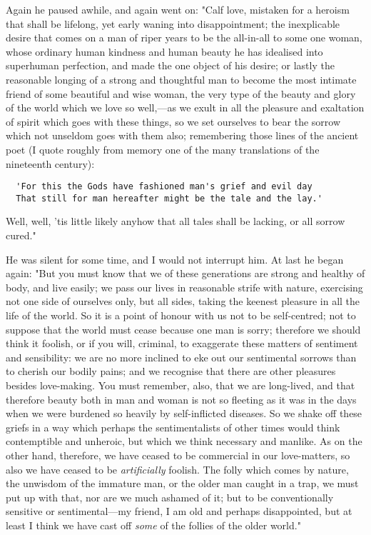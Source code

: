 Again he paused awhile, and again went on: "Calf love, mistaken for a
heroism that shall be lifelong, yet early waning into disappointment;
the inexplicable desire that comes on a man of riper years to be the
all-in-all to some one woman, whose ordinary human kindness and human
beauty he has idealised into superhuman perfection, and made the one
object of his desire; or lastly the reasonable longing of a strong and
thoughtful man to become the most intimate friend of some beautiful and
wise woman, the very type of the beauty and glory of the world which we
love so well,---as we exult in all the pleasure and exaltation of spirit
which goes with these things, so we set ourselves to bear the sorrow
which not unseldom goes with them also; remembering those lines of the
ancient poet (I quote roughly from memory one of the many translations
of the nineteenth century):

\begin{verbatim}
  'For this the Gods have fashioned man's grief and evil day
  That still for man hereafter might be the tale and the lay.'
\end{verbatim}

Well, well, 'tis little likely anyhow that all tales shall be lacking,
or all sorrow cured."

He was silent for some time, and I would not interrupt him. At last he
began again: "But you must know that we of these generations are strong
and healthy of body, and live easily; we pass our lives in reasonable
strife with nature, exercising not one side of ourselves only, but all
sides, taking the keenest pleasure in all the life of the world. So it
is a point of honour with us not to be self-centred; not to suppose that
the world must cease because one man is sorry; therefore we should think
it foolish, or if you will, criminal, to exaggerate these matters of
sentiment and sensibility: we are no more inclined to eke out our
sentimental sorrows than to cherish our bodily pains; and we recognise
that there are other pleasures besides love-making. You must remember,
also, that we are long-lived, and that therefore beauty both in man and
woman is not so fleeting as it was in the days when we were burdened so
heavily by self-inflicted diseases. So we shake off these griefs in a
way which perhaps the sentimentalists of other times would think
contemptible and unheroic, but which we think necessary and manlike. As
on the other hand, therefore, we have ceased to be commercial in our
love-matters, so also we have ceased to be \emph{artificially} foolish.
The folly which comes by nature, the unwisdom of the immature man, or
the older man caught in a trap, we must put up with that, nor are we
much ashamed of it; but to be conventionally sensitive or
sentimental---my friend, I am old and perhaps disappointed, but at least
I think we have cast off \emph{some} of the follies of the older world."

